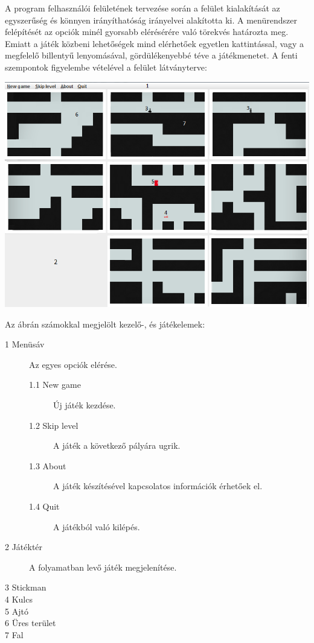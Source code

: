 	A program felhasználói felületének tervezése során a felület kialakítását az egyszerűség és könnyen irányíthatóság irányelvei alakította ki. A menürendszer  felépítését az opciók minél gyorsabb elérésérére való törekvés határozta meg. Emiatt a játék közbeni lehetőségek mind elérhetőek egyetlen kattintással, vagy a megfelelő billentyű lenyomásával, gördülékenyebbé téve a játékmenetet. A fenti szempontok figyelembe vételével a felület látványterve:
	\begin{center}
		    \includegraphics[scale=0.7]{resources/gui_own.png}
	 \end{center}
	 Az ábrán számokkal megjelölt kezelő-, és játékelemek:
	 \begin{description}	 
	  \item[1 Menüsáv] Az egyes opciók elérése.
 			\begin{description}
 			\item[1.1 New game]  Új játék kezdése.
 			\item[1.2 Skip level] A játék a következő pályára ugrik.
 			\item[1.3 About] A játék készítésével kapcsolatos információk érhetőek el.
 			\item[1.4 Quit] A játékból való kilépés.
			\end{description}
 	  \item[2 Játéktér] A folyamatban levő játék megjelenítése.
 	  \item[3 Stickman] 
 	  \item[4 Kulcs]
 	  \item[5 Ajtó]
 	  \item[6 Üres terület] 
 	  \item[7 Fal] 
     \end{description}

